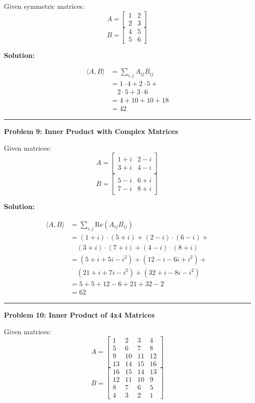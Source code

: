 \documentclass[
  letterpaper,
  DIV=11,
  numbers=noendperiod]{scrreprt}
\theoremstyle{plain}
\theoremstyle{definition}
\theoremstyle{remark}
\begin{document}
Given symmetric matrices: \[A=\begin{bmatrix}1&2\\2&3\end{bmatrix}\]
\[B=\begin{bmatrix}4&5\\5&6\end{bmatrix}\]

\textbf{Solution:}

\begin{align*}
\langle A,B \rangle &= \sum_{i,j} A_{ij} B_{ij} \\
&= 1\cdot4 + 2\cdot5 + \\
&\quad 2\cdot5 + 3\cdot6 \\
&= 4 + 10 + 10 + 18 \\
&= 42
\end{align*}

\begin{center}\rule{0.5\linewidth}{0.5pt}\end{center}

\textbf{Problem 9: Inner Product with Complex Matrices}

Given matrices: \[A=\begin{bmatrix}1+i&2-i\\3+i&4-i\end{bmatrix}\]
\[B=\begin{bmatrix}5-i&6+i\\7-i&8+i\end{bmatrix}\]

\textbf{Solution:}

\begin{align*}
\langle A,B \rangle &= \sum_{i,j} \text{Re}(A_{ij} \overline{B_{ij}}) \\
&= (1+i)\cdot(5+i) + (2-i)\cdot(6-i) + \\
&\quad (3+i)\cdot(7+i) + (4-i)\cdot(8+i) \\
&= (5+i+5i-i^2) + (12-i-6i+i^2) + \\
&\quad (21+i+7i-i^2) + (32+i-8i-i^2) \\
&= 5+5 + 12 - 6 + 21 + 32 - 2 \\
&= 62
\end{align*}

\begin{center}\rule{0.5\linewidth}{0.5pt}\end{center}

\textbf{Problem 10: Inner Product of 4x4 Matrices}

Given matrices:
\[A=\begin{bmatrix}1&2&3&4\\5&6&7&8\\9&10&11&12\\13&14&15&16\end{bmatrix}\]
\[B=\begin{bmatrix}16&15&14&13\\12&11&10&9\\8&7&6&5\\4&3&2&1\end{bmatrix}\]
\end{document}
